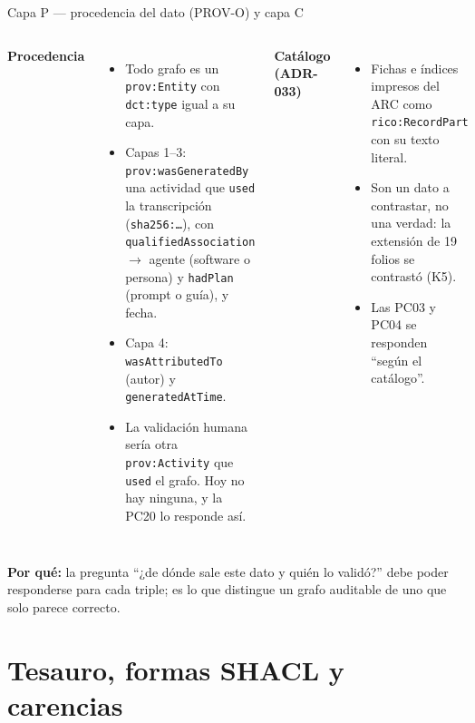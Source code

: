 \documentclass[aspectratio=169,10pt]{beamer}
\newcommand{\ttt}[1]{\texttt{\small #1}}
\newcommand{\porque}[1]{\par\smallskip\colorbox{ocre!10}{\parbox{\dimexpr\linewidth-2\fboxsep}{\footnotesize\textbf{Por qué:} #1}}}
\begin{document}
\begin{frame}{Capa P — procedencia del dato (PROV-O) y capa C}
\begin{columns}[T]
\small
\textbf{Procedencia}
\begin{itemize}\footnotesize
\item Todo grafo es un \ttt{prov:Entity} con \ttt{dct:type} igual a su capa.
\item Capas 1--3: \ttt{prov:wasGeneratedBy} una actividad que \ttt{used} la transcripción (\ttt{sha256:…}), con
      \ttt{qualifiedAssociation} $\to$ agente (software o persona) y \ttt{hadPlan} (prompt o guía), y fecha.
\item Capa 4: \ttt{wasAttributedTo} (autor) y \ttt{generatedAtTime}.
\item La validación humana sería otra \ttt{prov:Activity} que \ttt{used} el grafo. Hoy \alert{no hay ninguna}, y la PC20
      lo responde así.
\end{itemize}
\small
\textbf{Catálogo (ADR-033)}
\begin{itemize}\footnotesize
\item Fichas e índices impresos del ARC como \ttt{rico:RecordPart} con su texto literal.
\item Son un dato \alert{a contrastar}, no una verdad: la extensión de 19 folios se contrastó (K5).
\item Las PC03 y PC04 se responden \enquote{según el catálogo}.
\end{itemize}
\end{columns}
\porque{la pregunta \enquote{¿de dónde sale este dato y quién lo validó?} debe poder responderse para cada triple; es lo
que distingue un grafo auditable de uno que solo parece correcto.}
\end{frame}

\section{Tesauro, formas SHACL y carencias}
\end{document}
